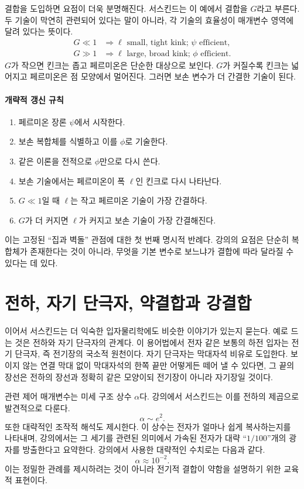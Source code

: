 결합을 도입하면 요점이 더욱 분명해진다. 서스킨드는 이 예에서 결합을 \(G\)라고 부른다. 두 기술이 막연히 관련되어 있다는 말이 아니라, 각 기술의 효율성이 매개변수 영역에 달려 있다는 뜻이다.
\begin{align}
G \ll 1
&\Rightarrow
\ell\text{ small, tight kink; }\psi\text{ efficient},\\
G \gg 1
&\Rightarrow
\ell\text{ large, broad kink; }\phi\text{ efficient}.
\end{align}
\(G\)가 작으면 킨크는 좁고 페르미온은 단순한 대상으로 보인다. \(G\)가 커질수록 킨크는 넓어지고 페르미온은 점 모양에서 멀어진다. 그러면 보손 변수가 더 간결한 기술이 된다.

\paragraph{개략적 갱신 규칙}
\begin{enumerate}
\item 페르미온 장론 \(\psi\)에서 시작한다.
\item 보손 복합체를 식별하고 이를 \(\phi\)로 기술한다.
\item 같은 이론을 전적으로 \(\phi\)만으로 다시 쓴다.
\item 보손 기술에서는 페르미온이 폭 \(\ell\)인 킨크로 다시 나타난다.
\item \(G\ll 1\)일 때 \(\ell\)는 작고 페르미온 기술이 가장 간결하다.
\item \(G\)가 더 커지면 \(\ell\)가 커지고 보손 기술이 가장 간결해진다.
\end{enumerate}

이는 고정된 ``집과 벽돌'' 관점에 대한 첫 번째 명시적 반례다. 강의의 요점은 단순히 복합체가 존재한다는 것이 아니라, 무엇을 기본 변수로 보느냐가 결합에 따라 달라질 수 있다는 데 있다.

\section{전하, 자기 단극자, 약결합과 강결합}

이어서 서스킨드는 더 익숙한 입자물리학에도 비슷한 이야기가 있는지 묻는다. 예로 드는 것은 전하와 자기 단극자의 관계다. 이 용어법에서 전자 같은 보통의 하전 입자는 전기 단극자, 즉 전기장의 국소적 원천이다. 자기 단극자는 막대자석 비유로 도입한다. 보이지 않는 연결 막대 없이 막대자석의 한쪽 끝만 어떻게든 떼어 낼 수 있다면, 그 끝의 장선은 전하의 장선과 정확히 같은 모양이되 전기장이 아니라 자기장일 것이다.

관련 제어 매개변수는 미세 구조 상수 \(\alpha\)다. 강의에서 서스킨드는 이를 전하의 제곱으로 발견적으로 다룬다.
\begin{equation}
\alpha \sim e^2.
\end{equation}
또한 대략적인 조작적 해석도 제시한다. 이 상수는 전자가 얼마나 쉽게 복사하는지를 나타내며, 강의에서는 그 세기를 관련된 의미에서 가속된 전자가 대략 ``\(1/100\)''개의 광자를 방출한다고 요약한다. 강의에서 사용한 대략적인 수치로는 다음과 같다.
\begin{equation}
\alpha \approx 10^{-2}.
\end{equation}
이는 정밀한 관례를 제시하려는 것이 아니라 전기적 결합이 약함을 설명하기 위한 교육적 표현이다.

